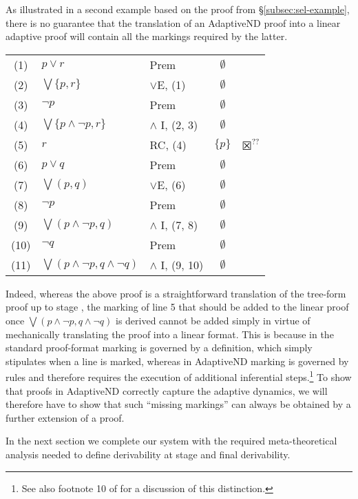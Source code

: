 \documentclass[]{article}
\begin{document}
As illustrated in a second example based on the proof from \S \ref{subsec:sel-example}, there is no guarantee that the translation of an {\sf AdaptiveND} proof into a linear adaptive proof will contain all the markings required by the latter.
\begin{center}
    \begin{tabular}{cllcl}
        (1) & $p \vee r$ & Prem & $\emptyset$\\
        (2) & $\bigvee \{p, r\}$ & $\vee$E, (1) & $\emptyset$\\
        (3) & $\neg p$ & Prem & $\emptyset$\\
        (4) & $\bigvee \{p \wedge \neg p, r\}$ & $\wedge$ I, (2, 3) & $\emptyset$\\
        (5) & $r$ & RC, (4) & $\{p\}$ & $\XBox^{??}$\\
        (6) & $p \vee q$ & Prem & $\emptyset$\\
        (7) & $\bigvee(p, q)$ & $\vee$E, (6)& $\emptyset$\\
        (8) & $\neg p$ & Prem & $\emptyset$\\
        (9) & $\bigvee(p \wedge \neg p, q)$ & $\wedge$ I, (7, 8) & $\emptyset$\\
        (10) & $\neg q$ & Prem & $\emptyset$\\
        (11) & $\bigvee(p \wedge \neg p, q \wedge \neg q)$ & $\wedge$ I, (9, 10) & $\emptyset$
    \end{tabular}
\end{center}
Indeed, whereas the above proof is a straightforward translation of the tree-form proof up to stage {}, the marking of line 5 that should be added to the linear proof once $\bigvee(p \wedge \neg p, q \wedge \neg q)$ is derived cannot be added simply in virtue of mechanically translating the proof into a linear format. This is because in the standard proof-format marking is governed by a definition, which simply stipulates when a line is marked, whereas in \textsf{AdaptiveND} marking is governed by rules and therefore requires the execution of additional inferential steps.\footnote{See also footnote 10 of \cite{BDVM08} for a discussion of this distinction.} To show that proofs in \textsf{AdaptiveND} correctly capture the adaptive dynamics, we will therefore have to show that such ``missing markings'' can always be obtained by a further extension of a proof.

In the next section we complete our system with the required meta-theoretical analysis needed to define derivability at stage and final derivability.
\end{document}
